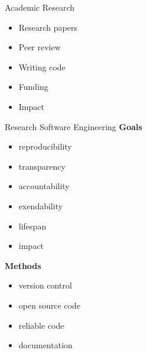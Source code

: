 \documentclass{beamer} %
\begin{document}
  \begin{frame}{Academic Research}
    \begin{itemize}
      \item Research papers
      \item Peer review
      \item Writing code
      \item Funding
      \item Impact
    \end{itemize}
    
  \end{frame}

  \begin{frame}{Research Software Engineering}
    \textbf{Goals}
    \begin{itemize}
      \item reproducibility
      \item transparency
      \item accountability
      \item exendability
      \item lifespan
      \item impact
    \end{itemize}

    \textbf{Methods}
    \begin{itemize}
      \item version control
      \item open source code
      \item reliable code
      \item documentation
    \end{itemize}
  \end{frame}



\end{document}
